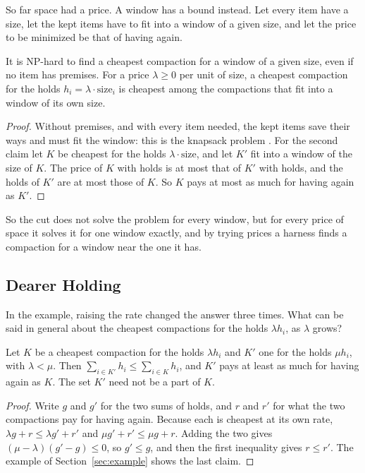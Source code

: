 \documentclass[acmsmall,nonacm,screen]{acmart}
\begin{document}
So far space had a price. A window has a bound instead. Let every item have a size, let the
kept items have to fit into a window of a given size, and let the price to be minimized be
that of having again.

\begin{proposition}[Windows]\label{prop:window}
It is NP-hard to find a cheapest compaction for a window of a given size, even if no item
has premises. For a price $\lambda \ge 0$ per unit of size, a cheapest compaction for the
holds $h_i = \lambda \cdot \text{size}_i$ is cheapest among the compactions that fit into a
window of its own size.
\end{proposition}

\begin{proof}
Without premises, and with every item needed, the kept items save their ways and must fit
the window: this is the knapsack problem \citep{Karp1972}. For the second claim let $K$ be
cheapest for the holds $\lambda \cdot \text{size}$, and let $K'$ fit into a window of the
size of $K$. The price of $K$ with holds is at most that of $K'$ with holds, and the holds
of $K'$ are at most those of $K$. So $K$ pays at most as much for having again as $K'$.
\end{proof}

So the cut does not solve the problem for every window, but for every price of space it
solves it for one window exactly, and by trying prices a harness finds a compaction for a
window near the one it has.

\subsection{Dearer Holding}

In the example, raising the rate changed the answer three times. What can be said in
general about the cheapest compactions for the holds $\lambda h_i$, as $\lambda$ grows?

\begin{proposition}\label{prop:dearer}
Let $K$ be a cheapest compaction for the holds $\lambda h_i$ and $K'$ one for the holds
$\mu h_i$, with $\lambda < \mu$. Then $\sum_{i \in K'} h_i \le \sum_{i \in K} h_i$, and $K'$
pays at least as much for having again as $K$. The set $K'$ need not be a part of $K$.
\end{proposition}

\begin{proof}
Write $g$ and $g'$ for the two sums of holds, and $r$ and $r'$ for what the two compactions
pay for having again. Because each is cheapest at its own rate, $\lambda g + r \le \lambda g'
+ r'$ and $\mu g' + r' \le \mu g + r$. Adding the two gives $(\mu - \lambda)(g' - g) \le 0$,
so $g' \le g$, and then the first inequality gives $r \le r'$. The example of
Section~\ref{sec:example} shows the last claim.
\end{proof}
\end{document}
